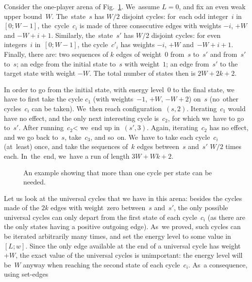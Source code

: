     \begin{example}  
    Consider the one-player arena of Fig.~\ref{fig-ex}. We~assume $L=0$, and fix an even  weak upper bound~$W$. 
    The~state~$s$ has $W/2$ disjoint cycles: for~each odd integer~$i$ in $[0;W-1]$, the~cycle~$c_i$ is made of three consecutive edges with weights $-i$, $+W$ and $-W+i+1$. Similarly, the~state~$s'$ has $W/2$ disjoint cycles: for even integers~$i$ in~$[0;W-1]$, the cycle~$c'_i$ has weights $-i$, $+W$ and~$-W+i+1$.  Finally, there are: two sequences of $k$ edges of weight~$0$ from~$s$ to~$s'$ and from~$s'$ to~$s$; an edge from the initial state to~$s$ with weight~$1$; an edge from~$s'$ to the target state with weight $-W$. The total number of states then is $2W+2k+2$.
    
    In order to go from the initial state, with energy level~$0$ to the final state, we have to first take the cycle $c_1$ (with weights~$-1$, $+W$, $-W+2$) on~$s$ (no~other cycles~$c_i$ can be taken). We~then reach configuration~$(s,2)$. Iterating~$c_1$ would have no effect, and the only next interesting cycle is~$c_2$, for which we~have to go to~$s'$. After running~$c_2$< we~end up in~$(s',3)$. Again, iterating~$c_2$ has no effect, and we go back to~$s$, take~$c_3$, and so~on. We~have to take each cycle~$c_i$ (at~least) once, and take the sequences of~$k$ edges between~$s$ and~$s'$ $W/2$ times each. In~the~end, we~have a run of length $3W+Wk+2$. 
    \vskip 0.5cm
    \begin{figure}[h]
      \centering
      \vspace{-2\medskipamount}
      \caption{An example showing that more than one cycle per state can be needed.}\label{fig-ex}
    \end{figure}
    \vskip 0.4cm
    Let us look at the universal cycles that we have in this arena:
    besides the cycles made of the $2k$ edges with weight~zero between~$s$ and~$s'$, the only possible universal cycles can only depart from the first state of each cycle~$c_i$ (as there are the only states having a positive outgoing edge). As~we proved, such cycles can be iterated arbitrarily many times, and set the energy level to some value in~$[L;w]$. Since the only edge available at the end of a universal cycle has weight~$+W$, the exact value of the universal cycles is unimportant: the energy level will be~$W$ anyway when reaching the second state of each cycle~$c_i$. As~a consequence, using set-edges

\end{example}
